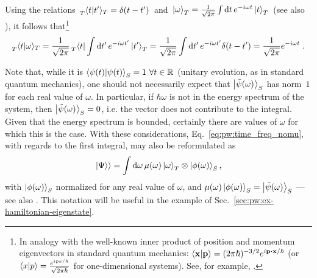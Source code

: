 Using the relations
$
\, \prescript{}{T}{\braket{t}{t'}}_T = \delta(t-t') \,
$
and
$
  \,
  \ket{\omega}_T =
  \frac{1}{\sqrt{2\pi}} \int\dd{t}e^{-i\omega t}\ket{t}_T
  \,
$
(see also \cite[2]{Lloyd:Time}),
it follows that\footnote{%
  In analogy with the well-known
  inner product of position and momentum eigenvectors in standard quantum mechanics:
  $\braket{\vb{x}}{\vb{p}} = (2\pi\hbar)^{-3/2}\E^{\iu \vb{p} \vdot \vb{x}  / \hbar}$
  (or $\braket{x}{p} = \frac{e^{i p x / \hbar}}{\sqrt{2\pi\hbar}}$ for one-dimensional systems).
  See, for example, \cite[126--127]{Ballentine}.
}
\begin{equation}\label{eq:pw:tscalaromega}
  \prescript{}{T}{\braket{t}{\omega}}_T =
  \frac{1}{\sqrt{2\pi}}\prescript{}{T}{\bra{t}} \int\dd{t'}e^{-i\omega t'}\ket{t'}_T  =
  \frac{1}{\sqrt{2\pi}}\int\dd{t'}e^{-i\omega t'}\delta(t-t') =
  \frac{1}{\sqrt{2\pi}} e^{-i\omega t} \; \text{.}
\end{equation}

Note that,
while it is $\braket{\psi(t)}_S = 1 \ \forall t \in \mathbb{R}$ (unitary evolution,
as in standard quantum mechanics),
one should not necessarily expect that
$\ket{\tilde{\psi}(\omega)}_S$ has norm~$1$ for each real value of $\omega$.
In particular, if $\hbar\omega$ is not in the energy spectrum of the system,
then $\ket{\tilde{\psi}(\omega)}_S = 0$, i.e. the vector does not contribute to the integral.
Given that the energy spectrum is bounded,
certainly there are values of $\omega$ for which this is the case.
With these considerations, Eq.~\eqref{eq:pw:time_freq_nomu}, with regards to the first integral, may also be reformulated as
\begin{equation}\label{eq:pw:time_freq_mu}
  \left.\left| \Psi \right\rangle\right\rangle =
    \int \dd{\omega} \mu(\omega) \ket{\omega}_{T} \otimes \ket{\phi(\omega)}_{S} \text{,}
\end{equation}
with $\ket{\phi(\omega)}_{S}$ normalized for any real value of $\omega$,
and $\mu(\omega)\ket{\phi(\omega)}_{S} = \ket{\tilde{\psi}(\omega)}_S$
--- see also \cite[eq.~(10)]{Lloyd:Time}.
This notation will be useful in the example of Sec.~\ref{sec:pw:ex-hamiltonian-eigenstate}.

